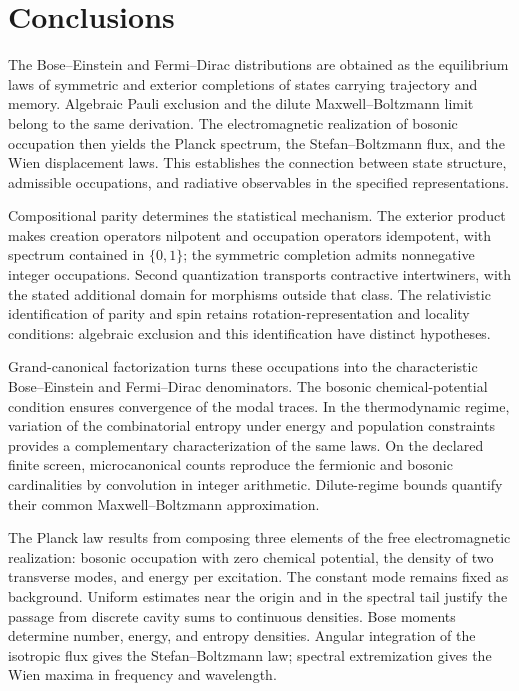 \begingroup\fontsize{10}{11.8}\selectfont\setlength{\parskip}{2pt}
\section{Conclusions}
\label{v:conclusiones}
The Bose--Einstein and Fermi--Dirac distributions are obtained as the
equilibrium laws of symmetric and exterior completions of states
carrying trajectory and memory. Algebraic Pauli exclusion and the
dilute Maxwell--Boltzmann limit belong to the same derivation.
The electromagnetic realization of bosonic occupation then yields
the Planck spectrum, the Stefan--Boltzmann flux, and the Wien
displacement laws. This establishes the connection between state
structure, admissible occupations, and radiative observables in the
specified representations.

Compositional parity determines the statistical mechanism.
The exterior product makes creation operators nilpotent and
occupation operators idempotent, with spectrum contained in
\(\{0,1\}\); the symmetric completion admits nonnegative integer
occupations. Second quantization transports contractive intertwiners,
with the stated additional domain for morphisms outside that class.
The relativistic identification of parity and spin retains
rotation-representation and locality conditions: algebraic exclusion
and this identification have distinct hypotheses.

Grand-canonical factorization turns these occupations into the
characteristic Bose--Einstein and Fermi--Dirac denominators.
The bosonic chemical-potential condition ensures convergence of the
modal traces. In the thermodynamic regime, variation of the combinatorial
entropy under energy and population constraints provides a complementary characterization of the same laws.
On the declared finite screen, microcanonical counts reproduce the
fermionic and bosonic cardinalities by convolution in integer
arithmetic. Dilute-regime bounds quantify their common
Maxwell--Boltzmann approximation.

The Planck law results from composing three elements of the free
electromagnetic realization: bosonic occupation with zero chemical
potential, the density of two transverse modes, and energy per
excitation. The constant mode remains fixed as background.
Uniform estimates near the origin and in the spectral tail justify
the passage from discrete cavity sums to continuous densities.
Bose moments determine number, energy, and entropy densities.
Angular integration of the isotropic flux gives the
Stefan--Boltzmann law; spectral extremization gives the Wien maxima
in frequency and wavelength.


